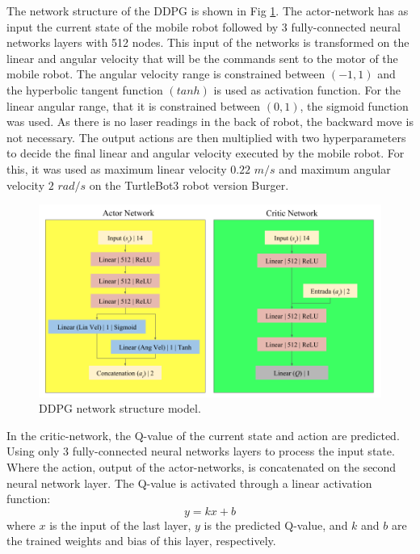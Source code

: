 The network structure of the DDPG is shown in Fig \ref{fig:projetointegrador}. 
The actor-network has as input the current state of the mobile robot followed by 3 fully-connected neural networks layers with 512 nodes.
This input of the networks is transformed on the linear and angular velocity that will be the commands sent to the motor of the mobile robot. 
The angular velocity range is constrained between $(-1,1)$ and the hyperbolic tangent function $(tanh)$ is used as activation function.
For the linear angular range, that it is constrained between $(0,1)$, the sigmoid function was used.
As there is no laser readings in the back of robot, the backward move is not necessary.
The output actions are then multiplied with two hyperparameters to decide the final linear and angular velocity executed by the mobile robot.
For this, it was used as maximum linear velocity $0.22$ $m/s$ and maximum angular velocity $2$ $rad/s$ on the TurtleBot3 robot version Burger.


\begin{figure}[H]
\centerline{\includegraphics[width=12cm]{images/projeto_integrador_en.png}}
\caption{DDPG network structure model.}
\label{fig:projetointegrador}
\end{figure}

In the critic-network, the Q-value of the current state and action are predicted.
Using only 3 fully-connected neural networks layers to process the input state.
Where the action, output of the actor-networks, is concatenated on the second neural network layer.
The Q-value is activated through a linear activation function:
\begin{equation}
y = kx +b
\end{equation}
where $x$ is the input of the last layer, $y$ is the predicted Q-value, and $k$ and $b$ are the trained weights and bias of this layer, respectively.

